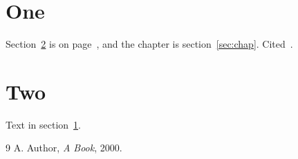\documentclass{article}
\begin{document}
\tableofcontents
\section{One}\label{sec:one}
Section~\ref{sec:two} is on page~\pageref{sec:two}, and the chapter is section~\ref{sec:chap}.
Cited~\cite{book}.
\section{Two}\label{sec:two}
Text in section~\ref{sec:one}.

\begin{thebibliography}{9}
 A. Author, \emph{A Book}, 2000.
\end{thebibliography}
\end{document}
